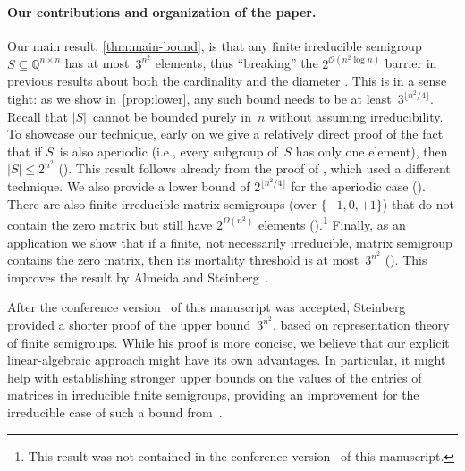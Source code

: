\documentclass{lmcs}
\theoremstyle{definition}
\newcommand{\OO}{\mathcal{O}}
\newcommand{\Q}{\mathbb{Q}}
\begin{document}
\paragraph*{Our contributions and organization of the paper.}

Our main result, \cref{thm:main-bound}, is that any finite irreducible semigroup $S \subseteq \Q^{n \times n}$ has at most~$3^{n^2}$ elements, thus ``breaking'' the $2^{\OO(n^2 \log n)}$ barrier in previous results about both the cardinality and the diameter \cite{Schutzenberger62,Berstel2011,AlmeidaSteinberg09,BumpusHKST20}.
This is in a sense tight: as we show in~\cref{prop:lower}, any such bound needs to be at least~$3^{\lfloor n^2/4 \rfloor}$.
Recall that $|S|$~cannot be bounded purely in~$n$ without assuming irreducibility.
To showcase our technique, early on we give a relatively direct proof of the fact that if $S$~is also aperiodic (i.e., every subgroup of~$S$ has only one element), then $|S| \le 2^{n^2}$ ().
This result follows already from the proof of \cite[Theorem~5.8]{AlmeidaSteinberg09}, which used a different technique.
We also provide a lower bound of $2^{\lfloor n^2/4 \rfloor}$ for the aperiodic case (). 
There are also finite irreducible matrix semigroups (over $\{-1,0,+1\}$) that do not contain the zero matrix but still have $2^{\Omega(n^2)}$ elements ().\footnote{This result was not contained in the conference version~\cite{KieferRyzhikovSTACS26} of this manuscript.}
Finally, as an application we show that if a finite, not necessarily irreducible, matrix semigroup contains the zero matrix, then its mortality threshold is at most~$3^{n^2}$ ().
This improves the result by Almeida and Steinberg~\cite{AlmeidaSteinberg09}.

After the conference version~\cite{KieferRyzhikovSTACS26} of this manuscript was accepted, Steinberg~\cite{Steinberg26} provided a shorter proof of the upper bound~$3^{n^2}$, based on representation theory of finite semigroups. While his proof is more concise, we believe that our explicit linear-algebraic approach might have its own advantages. In particular, it might help with establishing stronger upper bounds on the values of the entries of matrices in irreducible finite semigroups, providing an improvement for the irreducible case of such a bound from~\cite{Rida2025}.
\end{document}
